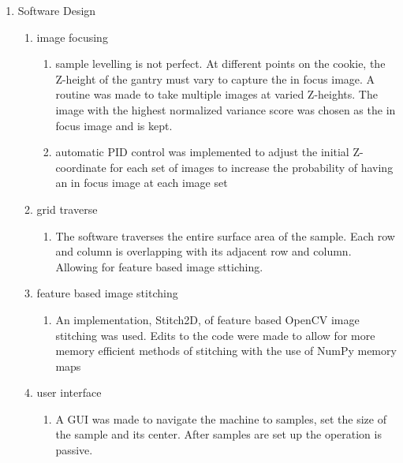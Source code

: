 \documentclass{article}
\begin{document}
\begin{outline}[enumerate]
\begin{enumerate}
\begin{enumerate}
			\end{enumerate}
		\item Software Design
			\begin{enumerate}
			\item image focusing
				\begin{enumerate}
				\item sample levelling is not perfect. At different points on the cookie, the Z-height of the gantry must vary to capture the in focus image. A routine was made to take multiple images at varied Z-heights. The image with the highest normalized variance score was chosen as the in focus image and is kept.
				\item automatic PID control was implemented to adjust the initial Z-coordinate for each set of images to increase the probability of having an in focus image at each image set
				\end{enumerate}
			\item grid traverse
				\begin{enumerate}
				\item The software traverses the entire surface area of the sample. Each row and column is overlapping with its adjacent row and column. Allowing for feature based image sttiching.
				\end{enumerate}
			\item feature based image stitching
				\begin{enumerate}
				\item An implementation, Stitch2D, of feature based OpenCV image stitching was used. Edits to the code were made to allow for more memory efficient methods of stitching with the use of NumPy memory maps
				\end{enumerate}
			\item user interface
				\begin{enumerate}
				\item A GUI was made to navigate the machine to samples, set the size of the sample and its center. After samples are set up the operation is passive.
				\end{enumerate}
			\end{enumerate}
		\end{enumerate}


\end{outline}
\end{document}
